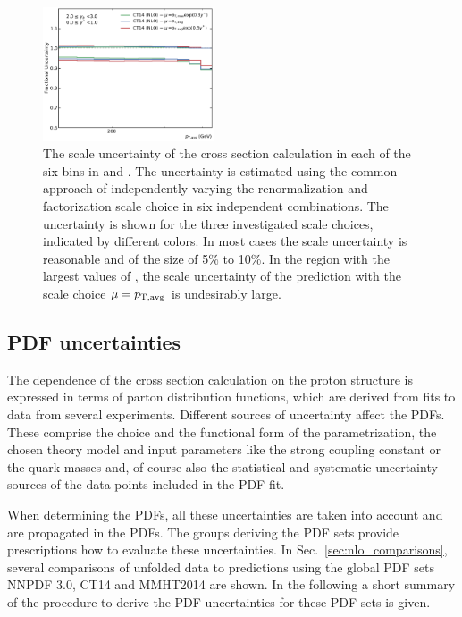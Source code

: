 \begin{figure}[htp]
    \includegraphics[width=0.45\textwidth]{figures/theory/scale_uncert_comp_yb2ys0.pdf}
    \caption[Scale Uncertainties of NLO calculation]{The scale uncertainty of
        the cross section calculation in each of the six bins in \ystar and
        \yboost. The uncertainty is estimated using the common approach of
        independently varying the renormalization and factorization scale choice
        in six independent combinations. The uncertainty is shown for the three
        investigated scale choices, indicated by different colors. In most cases
        the scale uncertainty is reasonable and of the size of 5\% to 10\%. In
        the region with the largest values of \ystar, the scale uncertainty of
        the prediction with the scale choice $\mu=p_{\mathrm{T,avg}}$ is undesirably large.}
    \label{fig:scale_uncertainties}
\end{figure}

\subsection{PDF uncertainties}
\label{sec:pdf_uncertainties}

The dependence of the cross section calculation on the proton structure is
expressed in terms of parton distribution functions, which are derived from
fits to data from several experiments. Different sources of
uncertainty affect the PDFs. These comprise the choice and the
functional form of the parametrization, the chosen theory model and input
parameters like the strong coupling constant \as or the quark masses and, of
course also the statistical and systematic uncertainty sources of the data points included in the PDF fit.

When determining the PDFs, all these uncertainties are taken into account and
are propagated in the PDFs. The groups deriving the PDF sets provide
prescriptions how to evaluate these uncertainties. In
Sec.~\ref{sec:nlo_comparisons}, several comparisons of unfolded data to predictions using the
global PDF sets NNPDF 3.0, CT14 and MMHT2014 are shown. In the following a short
summary of the procedure to derive the PDF uncertainties for these PDF sets is
given.


